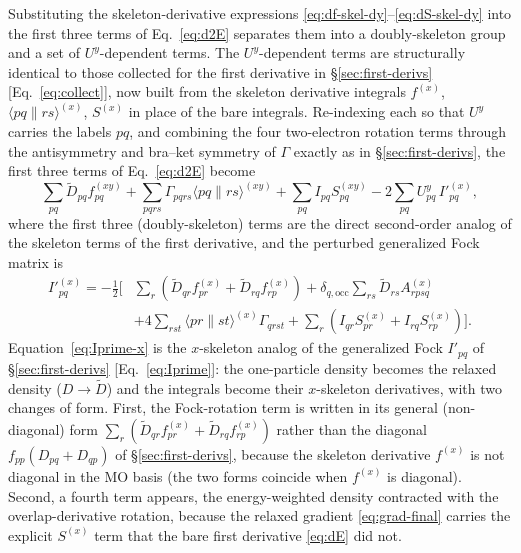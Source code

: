 \documentclass[12pt]{article}
\newcommand{\adb}[2]{\langle #1 \| #2 \rangle}
\newcommand{\occ}{\text{occ}}
\begin{document}
Substituting the skeleton-derivative expressions
\eqref{eq:df-skel-dy}--\eqref{eq:dS-skel-dy} into the first three terms of
Eq.~\eqref{eq:d2E} separates them into a doubly-skeleton group and a set of
$U^y$-dependent terms.  The $U^y$-dependent terms are structurally identical to
those collected for the first derivative in \S\ref{sec:first-derivs} [Eq.~\eqref{eq:collect}], now
built from the skeleton derivative integrals $f^{(x)}$, $\adb{pq}{rs}^{(x)}$,
$S^{(x)}$ in place of the bare integrals.  Re-indexing each so that $U^y$ carries
the labels $pq$, and combining the four two-electron rotation terms through the
antisymmetry and bra--ket symmetry of $\Gamma$ exactly as in \S\ref{sec:first-derivs}, the first
three terms of Eq.~\eqref{eq:d2E} become
\begin{equation}
\sum_{pq}\tilde D_{pq} f^{(xy)}_{pq}
+ \sum_{pqrs}\Gamma_{pqrs}\adb{pq}{rs}^{(xy)}
+ \sum_{pq} I_{pq} S^{(xy)}_{pq}
- 2\sum_{pq} U^y_{pq}\,I'^{(x)}_{pq},
\label{eq:d2E-grouped}
\end{equation}
where the first three (doubly-skeleton) terms are the direct second-order analog
of the skeleton terms of the first derivative, and the perturbed generalized
Fock matrix is
\begin{align}
I'^{(x)}_{pq} = -\tfrac12\Big[
&\sum_r\left(\tilde D_{qr} f^{(x)}_{pr} + \tilde D_{rq} f^{(x)}_{rp}\right)
+ \delta_{q,\occ}\sum_{rs}\tilde D_{rs} A^{(x)}_{rpsq}
\nonumber\\
&+ 4\sum_{rst}\adb{pr}{st}^{(x)}\Gamma_{qrst}
+ \sum_r\left(I_{qr} S^{(x)}_{pr} + I_{rq} S^{(x)}_{rp}\right)\Big].
\label{eq:Iprime-x}
\end{align}
Equation~\eqref{eq:Iprime-x} is the $x$-skeleton analog of the generalized Fock
$I'_{pq}$ of \S\ref{sec:first-derivs} [Eq.~\eqref{eq:Iprime}]: the one-particle density becomes the
relaxed density ($D\to\tilde D$) and the integrals become their $x$-skeleton
derivatives, with two changes of form.  First, the Fock-rotation term is written
in its general (non-diagonal) form $\sum_r(\tilde D_{qr}f^{(x)}_{pr}+\tilde
D_{rq}f^{(x)}_{rp})$ rather than the diagonal $f_{pp}(D_{pq}+D_{qp})$ of \S\ref{sec:first-derivs},
because the skeleton derivative $f^{(x)}$ is not diagonal in the MO basis (the
two forms coincide when $f^{(x)}$ is diagonal).  Second, a fourth term appears,
the energy-weighted density contracted with the overlap-derivative rotation,
because the relaxed gradient \eqref{eq:grad-final} carries the explicit
$S^{(x)}$ term that the bare first derivative \eqref{eq:dE} did not.
\end{document}
